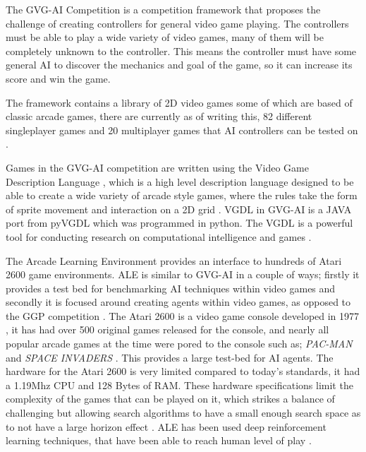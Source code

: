 \documentclass[journal]{IEEEtran}
\begin{document}
		The GVG-AI Competition is a competition framework that proposes the challenge of creating controllers for general video game playing. The controllers must be able to play a wide variety of video games, many of them will be completely unknown to the controller. This means the controller must have some general AI to discover the mechanics and goal of the game, so it can increase its score and win the game. \cite{GVGAI, perez20162014}
		
		The framework contains a library of 2D video games some of which are based of classic arcade games, there are currently as of writing this, 82 different singleplayer games and 20 multiplayer games that AI controllers can be tested on \cite{GVGAI, Gonzalez-castro}.
		
		Games in the GVG-AI competition are written using the Video Game Description Language \cite{schaul2014extensible}, which is a high level description language designed to be able to create a wide variety of arcade style games, where the rules take the form of sprite movement and interaction on a 2D grid \cite{nelson2016investigating}.
		VGDL in GVG-AI is a JAVA port from pyVGDL which was programmed in python. The VGDL is a powerful tool for conducting research on computational intelligence and games \cite{schaul2014extensible, love2008general}.

		The Arcade Learning Environment \cite{bellemare2013arcade, Chrabaszcz2018} provides an interface to hundreds of Atari 2600 game environments. ALE is similar to GVG-AI in a couple of ways; firstly it provides a test bed for benchmarking AI techniques within video games and secondly it is focused around creating agents within video games, as opposed to the GGP competition \cite{GGP2005general}.
		The Atari 2600 is a video game console developed in 1977 , it has had over 500 original games released for the console, and nearly all popular arcade games at the time were pored to the console such as; \textit{PAC-MAN} and \textit{SPACE INVADERS} \cite{bellemare2013arcade}. This provides a large test-bed for AI agents.
		The hardware for the Atari 2600 is very limited compared to today's standards, it had a 1.19Mhz CPU and 128 Bytes of RAM. These hardware specifications limit the complexity of the games that can be played on it, which strikes a balance of challenging but allowing search algorithms to have a small enough search space as to not have a large horizon effect \cite{bellemare2013arcade}.
		ALE has been used deep reinforcement learning techniques, that have been able to reach human level of play \cite{mnih2015human, gaina2017rolling}.
		
\end{document}

